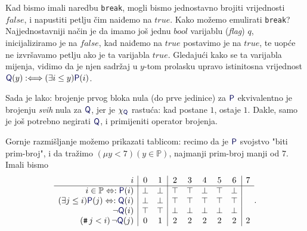 Kad bismo imali naredbu \texttt{break}, mogli bismo jednostavno brojiti vrijednosti $\mathit{false}$, i napustiti petlju čim naiđemo na $\mathit{true}$. Kako možemo emulirati \texttt{break}? Najjednostavniji način je da imamo još jednu $bool$ varijablu (\emph{flag}) $q$, inicijaliziramo je na $\mathit{false}$, kad naiđemo na $\mathit{true}$ postavimo je na $\mathit{true}$, te uopće ne izvršavamo petlju ako je ta varijabla $\mathit{true}$. Gledajući kako se ta varijabla mijenja, vidimo da je njen sadržaj u $y$-tom prolasku upravo istinitosna vrijednost $\f Q(y):\Longleftrightarrow(\exists i\le y)\f P(i)$.

Sada je lako: brojenje prvog bloka nula (do prve jedinice) za $\f P$ ekvivalentno je brojenju \emph{svih} nula za $\f Q$, jer je $\chi_{\f Q}$ rastuća: kad postane $1$, ostaje $1$. Dakle, samo je još potrebno negirati $\f Q$, i primijeniti operator brojenja.

Gornje razmišljanje možemo prikazati tablicom: recimo da je $\f P$ svojstvo "biti prim-broj", i da tražimo $(\mu y<7)(y\in\mathbb P)$, najmanji prim-broj manji od $7$. Imali bismo
\begin{equation}
    \begin{array}{r|cc|ccccc|c}
i & 0 & 1 & 2 & 3 & 4 & 5 & 6 & 7 \\\hline
i\in\mathbb P\Leftrightarrow:\f P(i) & \bot & \bot & \top & \top & \bot & \top & \bot  \\
(\exists j\le i)\f P(j)\Leftrightarrow:\f Q(i) & \bot & \bot & \top & \top & \top & \top & \top \\
\lnot\f Q(i) & \top & \top & \bot & \bot & \bot & \bot & \bot\\
(\num j<i)\,\lnot\f Q(j) & 0 & 1 & 2 & 2 & 2 & 2 & 2 & 2
\end{array}\text.
\end{equation}

